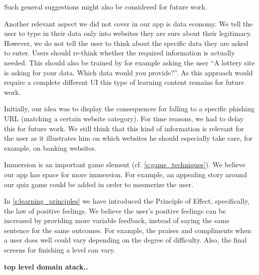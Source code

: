 \begin{description}[leftmargin=0cm]
	Such general suggestions might also be considered for future work.
	\item[Data Economy] Another relevant aspect we did not cover in our app is data economy.
	We tell the user to type in their data only into websites they are sure about their legitimacy.
	However, we do not tell the user to think about the specific data they are asked to enter.
	Users should re-think whether the required information is actually needed.
	This should also be trained by for example asking the user ``A lottery site is asking for your data. Which data would you provide?''. As this approach would require a complete different UI this type of learning content remains for future work.
	\item[Consequences] Initially, our idea was to display the consequences for falling to a specific phishing URL (matching a certain website category). For time reasons, we had to delay this for future work.
	We still think that this kind of information is relevant for the user as it illustrates him on which websites he should especially take care, for example, on banking websites.
	\item[Increase Immersion] Immersion is an important game element (cf. \autoref{s:game_techniques}).
	We believe our app has space for more immersion. 
	For example, an appealing story around our quiz game could be added in order to mesmerize the user.
	\item[Increase Effect] In \autoref{s:learning_principles} we have introduced the Principle of Effect, specifically, the law of positive feelings. 
	We believe the user's positive feelings can be increased by providing more variable feedback, instead of saying the same sentence for the same outcomes.
	For example, the praises and compliments when a user does well could vary depending on the degree of difficulty.
	Also, the final screens for finishing a level can vary.
\end{description}

 
\textbf{top level domain atack..}
